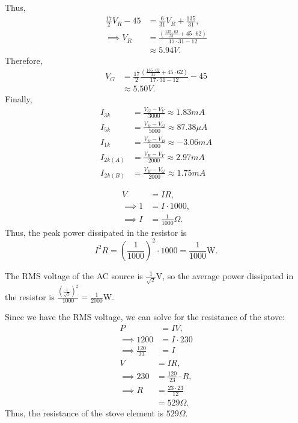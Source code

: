 \documentclass{article}
\begin{document}
Thus,
\begin{align*}
    \frac{17}2V_R - 45 &= \frac{6}{31}V_R+\frac{135}{31}, \\
    \implies V_R       &= \frac{\left(\frac{135\cdot62}{31}+45\cdot62\right)}{17\cdot31-12} \\
                       &\approx 5.94V.
\end{align*}
Therefore,
\begin{align*}
    V_G &= \frac{17}2\frac{\left(\frac{135\cdot62}{31}+45\cdot62\right)}{17\cdot31-12} - 45 \\
        &\approx 5.50V.
\end{align*}
Finally,
\begin{align*}
    I_{3k}    &= \frac{V_G - V_Y}{3000} \approx 1.83mA \\
    I_{5k}    &= \frac{V_R - V_G}{5000} \approx 87.38\mu A \\
    I_{1k}    &= \frac{V_R - V_B}{1000} \approx -3.06mA \\
    I_{2k(A)} &= \frac{V_R - V_Y}{2000} \approx 2.97mA \\
    I_{2k(B)} &= \frac{V_B - V_G}{2000} \approx 1.75mA
\end{align*}

\noindent{}
\begin{align*}
    V &= IR, \\
    \implies 1 &= I \cdot 1000, \\
    \implies I &= \frac1{1000}\Omega.
\end{align*}
Thus, the peak power dissipated in the resistor is $$I^2R = \left(\frac1{1000}\right)^2 \cdot 1000 = \frac{1}{1000}\text{W}.$$

The RMS voltage of the AC source is $\frac1{\sqrt{2}}$V, so the average power dissipated in the resistor is $\frac{\left(\frac1{\sqrt2}\right)^2}{1000} = \frac1{2000}$W.

\noindent{}

    Since we have the RMS voltage, we can solve for the resistance of the stove:
    \begin{align*}
             P              &= IV, \\
    \implies 1200           &= I \cdot 230 \\
    \implies \frac{120}{23} &= I
    \end{align*}
    \begin{align*}
             V &= IR, \\
    \implies 230 &= \frac{120}{23} \cdot R, \\
    \implies R &= \frac{23 \cdot 23}{12} \\
               &= 529\Omega.
    \end{align*}
    Thus, the resistance of the stove element is $529\Omega$.
\end{document}
